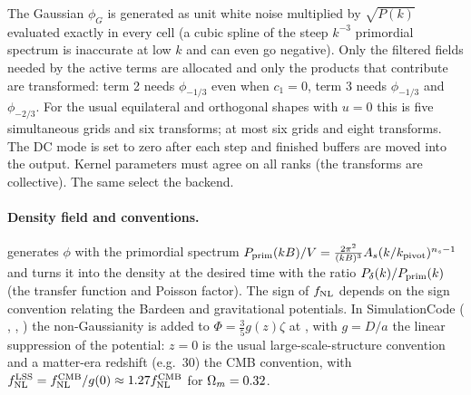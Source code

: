 \begin{implementation}
The Gaussian $\phi_G$ is generated as unit white noise multiplied by $\sqrt{P(k)}$ evaluated exactly in every cell (a
cubic spline of the steep $k^{-3}$ primordial spectrum is inaccurate at low $k$ and can even go negative). Only the
filtered fields needed by the active terms are allocated and only the products that contribute are transformed: term 2
needs $\phi_{-1/3}$ even when $c_1=0$, term 3 needs $\phi_{-1/3}$ and $\phi_{-2/3}$. For the usual equilateral and
orthogonal shapes with $u=0$ this is five simultaneous grids and six transforms; at most six grids and eight
transforms. The DC mode is set to zero after each step and finished buffers are moved into the output. Kernel
parameters must agree on all ranks (the transforms are collective). The same  select the
backend.
\end{implementation}

\paragraph*{Density field and conventions.}
 generates $\phi$ with the primordial spectrum
$P_{\rm prim}(kB)/V=\frac{2\pi^2}{(kB)^3}A_s(k/k_{\rm pivot})^{n_s-1}$ and turns it into the density at the desired time
with the ratio $P_\delta(k)/P_{\rm prim}(k)$ (the transfer function and Poisson factor). The sign of $f_{\rm NL}$
depends on the sign convention relating the Bardeen and gravitational potentials. In SimulationCode
( , , ) the non-Gaussianity is
added to $\Phi=\frac35g(z)\zeta$ at , with $g=D/a$ the linear suppression of the potential:
$z=0$ is the usual large-scale-structure convention and a matter-era redshift (e.g.\ 30) the CMB convention, with
$f_{\rm NL}^{\rm LSS}=f_{\rm NL}^{\rm CMB}/g(0)\approx1.27f_{\rm NL}^{\rm CMB}$ for $\Omega_m=0.32$.

